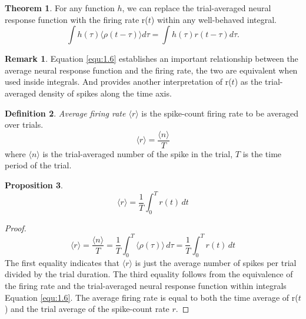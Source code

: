 \documentclass[letterpaper,oneside]{book}
\numberwithin{equation}{chapter}
\theoremstyle{definition}
\newtheorem{thm}{Theorem}[chapter]
\newtheorem{defn}[thm]{Definition}
\newtheorem{prop}[thm]{Proposition}
\newtheorem{rem}{Remark}[chapter]
\begin{document}
\begin{multicols}{2}
\begin{thm}
  For any function $h$, 
  we can
replace the trial-averaged neural response function with the firing rate r($t$)
within any well-behaved integral.
  \begin{equation}
    \label{equ:1.6}
    \int h(\tau)\langle \rho(t-\tau)\rangle d\tau = \int h(\tau)r(t-\tau)d\tau.
  \end{equation}
\end{thm}

\begin{rem}
  Equation \ref{equ:1.6} establishes an important relationship between the
average neural response function and the firing rate, the two are equivalent when used inside 
integrals. And provides another interpretation of
  r($t$) as the trial-averaged density of spikes along the time axis.
\end{rem}

\begin{defn}
  \emph{Average firing rate $\langle r \rangle $} is the spike-count firing rate to be averaged over trials.
  \begin{equation}
    \label{equ:1.7}
    \langle r\rangle =\frac{\langle n\rangle }{T}
  \end{equation}
   where $\langle n \rangle $ is the trial-averaged number of the spike in the trial, 
   $T$ is the time period of the trial.
\end{defn}

\begin{prop}
  \begin{equation*}
    \langle r\rangle=\frac{1}{T}\int_{0}^{T}r(t)\,dt
  \end{equation*}
  \begin{proof}
    \begin{equation*}
      \langle r\rangle =\frac{\langle n\rangle }{T}
    =\frac{1}{T}\int_{0}^{T} \langle\rho(\tau) \rangle \,d\tau =\frac{1}{T}\int_{0}^{T}r(t)\,dt
    \end{equation*}
    The first equality indicates that $\langle r\rangle $ is just the average 
   number of spikes per trial divided by the trial duration. The third equality follows from
the equivalence of the firing rate and the trial-averaged neural response
function within integrals Equation \ref{equ:1.6}. The average firing rate is equal to
both the time average of r($t$) and the trial average of the spike-count rate $r$. 
  \end{proof}
\end{prop}


\end{multicols}
\end{document}
